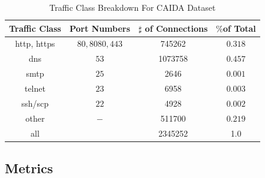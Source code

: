  \begin{table}[h!]
  \begin{center}
    \caption{Traffic Class Breakdown For CAIDA Dataset}
    \label{tab:traffic_class}
    \begin{tabular}{c|c|c|c}
     \textbf{Traffic Class}& \textbf{Port Numbers} &\textbf{$\sharp$ of 			  Connections}&\textbf{$\%$of Total}\\
      \hline
		http, https& $80, 8080, 443$&745262&$0.318$\\
		dns& $53$&1073758&$0.457$\\
		smtp& $25$&2646&$0.001$\\
		telnet&$23$&6958&$0.003$\\
		ssh/scp&$22$&4928&$0.002$\\
		other&$-$&511700&$0.219$\\
		\hline
		all &&2345252&1.0\\
		\hline
    \end{tabular}
  \end{center}
\end{table}


\subsection{Metrics}

